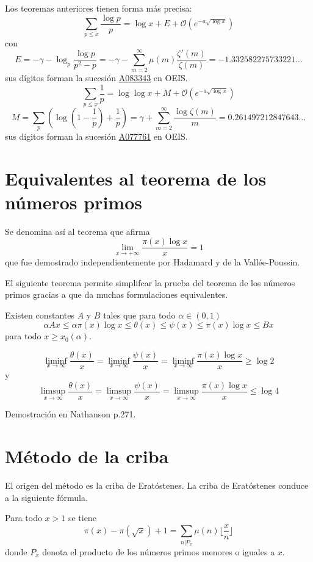 \documentclass[TAN.tex]{subfiles}
\begin{document}
Los teoremas anteriores tienen forma más precisa:
\[ \sum_{p≤x} \frac{\log p}{p} = \log x + E + \mathcal{O}(e^{-a\sqrt{\log x}}) \]
con
\[ E = -γ-\log_{p} \frac{\log p}{p^2-p} = -γ-\sum_{m=2}^{∞} μ(m) \frac{ζ'(m)}{ζ(m)} = -1.332582275733221... \]
sus dígitos forman la sucesión \href{https://oeis.org/A083343}{A083343} en OEIS.
\[ \sum_{p≤x} \frac{1}{p} = \log \log x + M + \mathcal{O}(e^{-a\sqrt{\log x}}) \]
\[ M = \sum_{p} \left(\log \left(1-\frac{1}{p}\right)+\frac{1}{p}\right) = γ + \sum_{m=2}^{∞} \frac{\log ζ(m)}{m} = 0.261497212847643... \]
sus dígitos forman la sucesión \href{https://oeis.org/A077761}{A077761} en OEIS. 

\section{Equivalentes al teorema de los números primos}
Se denomina así al teorema que afirma
\[ \lim_{x\to+∞} \frac{π(x)\log x}{x} = 1 \]
que fue demostrado independientemente por Hadamard y de la Vallée-Poussin.

El siguiente teorema permite simplifcar la prueba del teorema de los números primos gracias a que da muchas formulaciones equivalentes.

\begin{teorema}[Chebyshev]
Existen constantes $A$ y $B$ tales que para todo $α \in (0,1)$
\[ αAx ≤ απ(x)\log x ≤ θ(x) ≤ ψ(x) ≤ π(x)\log x ≤ Bx \]
para todo $x ≥ x_0(α)$.
\end{teorema}

\begin{teorema}[Chebyshev]
\[ \liminf_{x\to∞} \frac{θ(x)}{x} = \liminf_{x\to∞} \frac{ψ(x)}{x} = \liminf_{x\to∞} \frac{π(x)\log x}{x} ≥ \log 2 \]
y
\[ \limsup_{x\to∞} \frac{θ(x)}{x} = \limsup_{x\to∞} \frac{ψ(x)}{x} = \limsup_{x\to∞} \frac{π(x)\log x}{x} ≤ \log 4 \]
\end{teorema}
Demostración en Nathanson p.271.

\section{Método de la criba}
El origen del método es la criba de Eratóstenes. La criba de Eratóstenes conduce a la siguiente fórmula.

\begin{teorema}
Para todo $x > 1$ se tiene
\[ π(x) - π(\sqrt{x}) + 1 = \sum_{n|P_x}μ(n)\lfloor\frac{x}{n}\rfloor \]
donde $P_x$ denota el producto de los números primos menores o iguales a $x$.
\end{teorema}
\end{document}
